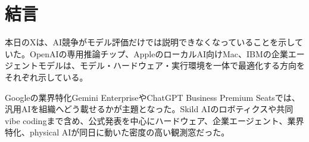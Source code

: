\section*{結言}
本日のXは、AI競争がモデル評価だけでは説明できなくなっていることを示していた。OpenAIの専用推論チップ、AppleのローカルAI向けMac、IBMの企業エージェントモデルは、モデル・ハードウェア・実行環境を一体で最適化する方向をそれぞれ示している。

Googleの業界特化Gemini EnterpriseやChatGPT Business Premium Seatsでは、汎用AIを組織へどう載せるかが主題となった。Skild AIのロボティクスや共同vibe codingまで含め、公式発表を中心にハードウェア、企業エージェント、業界特化、physical AIが同日に動いた密度の高い観測窓だった。
